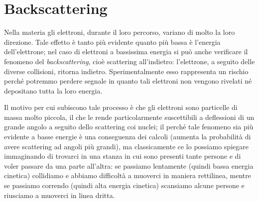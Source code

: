 \section{Backscattering}

\begin{minipage}{0.245\textwidth}
\end{minipage}
\begin{minipage}{0.75\textwidth}
    Nella materia gli elettroni, durante il loro percorso, variano di molto la loro direzione. Tale effetto è tanto più evidente quanto più bassa è l'energia dell'elettrone; nel caso di elettroni a bassissima energia si può anche verificare il fenomeno del \textit{backscattering}, cioè scattering all'indietro: l'elettrone, a seguito delle diverse collisioni, ritorna indietro. Sperimentalmente esso rappresenta un rischio perché potremmo perdere segnale in quanto tali elettroni non vengono rivelati né depositano tutta la loro energia.
\end{minipage}

\vspace{0.4cm}Il motivo per cui subiscono tale processo è che gli elettroni sono particelle di massa molto piccola, il che le rende particolarmente suscettibili a deflessioni di un grande angolo a seguito dello scattering coi nuclei; il perché tale fenomeno sia più evidente a basse energie è una conseguenza dei calcoli (aumenta la probabilità di avere scattering ad angoli più grandi), ma classicamente ce lo possiamo spiegare immaginando di trovarci in una stanza in cui sono presenti tante persone e di voler passare da una parte all'altra: se passiamo lentamente (quindi bassa energia cinetica) collidiamo e abbiamo difficoltà a muoverci in maniera rettilinea, mentre se passiamo correndo (quindi alta energia cinetica) scansiamo alcune persone e riusciamo a muoverci in linea dritta.

